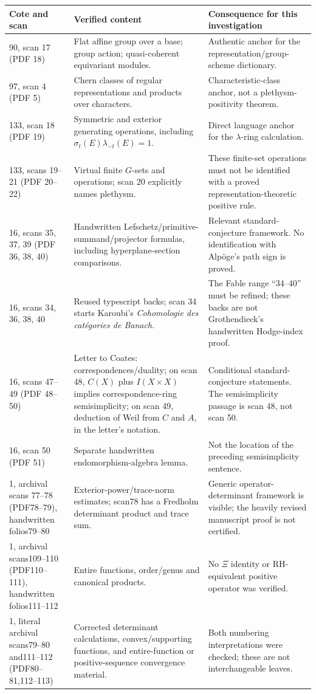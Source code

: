 \documentclass[11pt,a4paper]{article}
\theoremstyle{named}\newtheorem{finding}{Finding}[section]
\theoremstyle{definition}\newtheorem{definition}[finding]{Definition}
\theoremstyle{remark}\newtheorem{remark}[finding]{Remark}
\begin{document}
{\small\begin{longtable}{p{.19\linewidth}p{.36\linewidth}p{.37\linewidth}}
\toprule Cote and scan&Verified content&Consequence for this investigation\\\midrule\endhead
90, scan 17 (PDF 18)&Flat affine group over a base; group action; quasi-coherent equivariant modules.&Authentic anchor for the representation/group-scheme dictionary.\\
97, scan 4 (PDF 5)&Chern classes of regular representations and products over characters.&Characteristic-class anchor, not a plethysm-positivity theorem.\\
133, scan 18 (PDF 19)&Symmetric and exterior generating operations, including $\sigma_t(E)\lambda_{-t}(E)=1$.&Direct language anchor for the $\lambda$-ring calculation.\\
133, scans 19--21 (PDF 20--22)&Virtual finite $G$-sets and operations; scan 20 explicitly names plethysm.&These finite-set operations must not be identified with a proved representation-theoretic positive rule.\\
16, scans 35, 37, 39 (PDF 36, 38, 40)&Handwritten Lefschetz/primitive-summand/projector formulas, including hyperplane-section comparisons.&Relevant standard-conjecture framework. No identification with Alp\"oge's path sign is proved.\\
16, scans 34, 36, 38, 40&Reused typescript backs; scan 34 starts Karoubi's \emph{Cohomologie des cat\'egories de Banach}.&The Fable range ``34--40'' must be refined; these backs are not Grothendieck's handwritten Hodge-index proof.\\
16, scans 47--49 (PDF 48--50)&Letter to Coates: correspondences/duality; on scan 48, $C(X)$ plus $I(X\times X)$ implies correspondence-ring semisimplicity; on scan 49, deduction of Weil from $C$ and $A$, in the letter's notation.&Conditional standard-conjecture statements. The semisimplicity passage is scan 48, not scan 50.\\
16, scan 50 (PDF 51)&Separate handwritten endomorphism-algebra lemma.&Not the location of the preceding semisimplicity sentence.\\
1, archival scans 77--78 (PDF78--79), handwritten folios79--80&Exterior-power/trace-norm estimates; scan78 has a Fredholm determinant product and trace sum.&Generic operator-determinant framework is visible; the heavily revised manuscript proof is not certified.\\
1, archival scans109--110 (PDF110--111), handwritten folios111--112&Entire functions, order/genus and canonical products.&No $\Xi$ identity or RH-equivalent positive operator was verified.\\
1, literal archival scans79--80 and111--112 (PDF80--81,112--113)&Corrected determinant calculations, convex/supporting functions, and entire-function or positive-sequence convergence material.&Both numbering interpretations were checked; these are not interchangeable leaves.\\\bottomrule
\end{longtable}}
\end{document}
